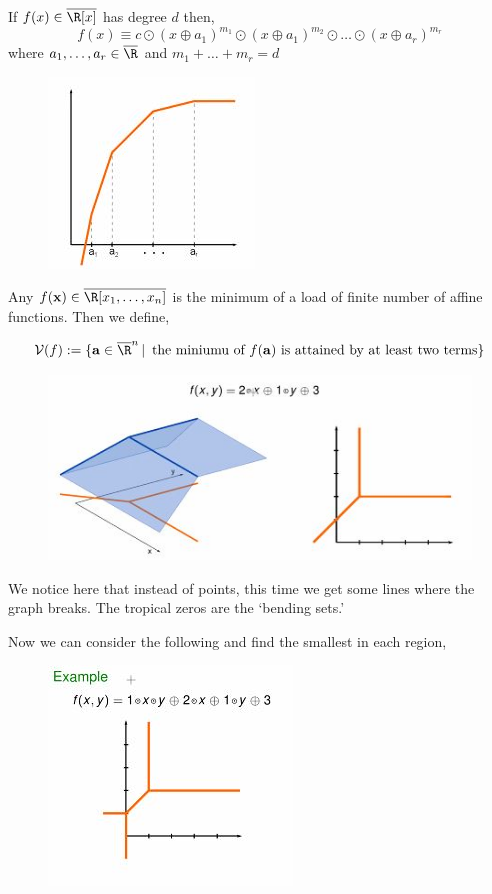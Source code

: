 \documentclass{article}
\begin{document}
\newpage
\begin{nthm}
  If $f(x)\in\overline\R [x]$ has degree $d$ then,
  $$ f(x) \equiv c\odot (x\oplus a_1)^{m_1} \odot (x\oplus a_1)^{m_2} \odot\dots\odot (x\oplus a_r)^{m_r} $$
  where $a_1, \dots, a_r \in \overline\R$ and $m_1 + \dots + m_r = d$
  \begin{figure}[!ht]
  \centering
  \includegraphics{./figures/L2.2}
  \caption{}
  \end{figure}
\end{nthm}

Any $f(\mathbf{x}) \in \overline\R [x_1, \dots, x_n]$ is the minimum of a load of finite number of affine functions. Then we define,
\begin{ndefi}
  $$ \mathcal{V}(f) := \{\mathbf{a} \in \overline\R^n \,|\, \text{ the miniumu of $f(\mathbf{a})$ is attained by at least two terms}\} $$
\end{ndefi}

\begin{figure}[!ht]
\centering
\includegraphics{./figures/L2.3}
\end{figure}

We notice here that instead of points, this time we get some lines where the graph breaks. The tropical zeros are the `bending sets.'\\

\newpage

Now we can consider the following and find the smallest in each region,
\begin{figure}[!ht]
\centering
\includegraphics{./figures/L2.4}
\end{figure}
\end{document}
